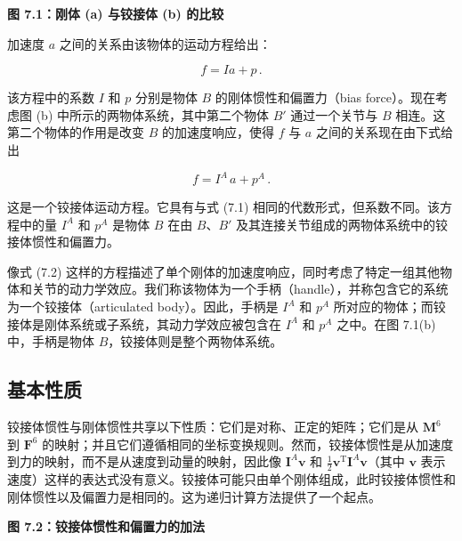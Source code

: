 \documentclass[10pt,a4paper]{book}
\theoremstyle{thmstyle} %
\theoremstyle{defstyle} %
\theoremstyle{prostyle} %
\begin{document}
\noindent\textbf{图 7.1：刚体 (a) 与铰接体 (b) 的比较}





加速度 $a$ 之间的关系由该物体的运动方程给出：



$$
f = I a + p \, .
$$



该方程中的系数 $I$ 和 $p$ 分别是物体 $B$ 的刚体惯性和偏置力（bias force）。现在考虑图 (b) 中所示的两物体系统，其中第二个物体 $B'$ 通过一个关节与 $B$ 相连。这第二个物体的作用是改变 $B$ 的加速度响应，使得 $f$ 与 $a$ 之间的关系现在由下式给出



$$
f = I^{A} \, a + p^{A} \, .
$$



这是一个铰接体运动方程。它具有与式 (7.1) 相同的代数形式，但系数不同。该方程中的量 $I^{A}$ 和 $p^{A}$ 是物体 $B$ 在由 $B$、$B'$ 及其连接关节组成的两物体系统中的铰接体惯性和偏置力。



像式 (7.2) 这样的方程描述了单个刚体的加速度响应，同时考虑了特定一组其他物体和关节的动力学效应。我们称该物体为一个手柄（handle），并称包含它的系统为一个铰接体（articulated body）。因此，手柄是 $I^{A}$ 和 $p^{A}$ 所对应的物体；而铰接体是刚体系统或子系统，其动力学效应被包含在 $I^{A}$ 和 $p^{A}$ 之中。在图 7.1(b) 中，手柄是物体 $B$，铰接体则是整个两物体系统。



\subsection{基本性质}





铰接体惯性与刚体惯性共享以下性质：它们是对称、正定的矩阵；它们是从 $\mathbf{M}^{6}$ 到 $\mathbf{F}^{6}$ 的映射；并且它们遵循相同的坐标变换规则。然而，铰接体惯性是从加速度到力的映射，而不是从速度到动量的映射，因此像 $\mathbf{I}^{A}\boldsymbol{v}$ 和 $\frac{1}{2}\boldsymbol{v}^{\mathrm{T}}\boldsymbol{I}^{A}\boldsymbol{v}$（其中 $\boldsymbol{v}$ 表示速度）这样的表达式没有意义。铰接体可能只由单个刚体组成，此时铰接体惯性和刚体惯性以及偏置力是相同的。这为递归计算方法提供了一个起点。



\noindent\textbf{图 7.2：铰接体惯性和偏置力的加法}
\end{document}
